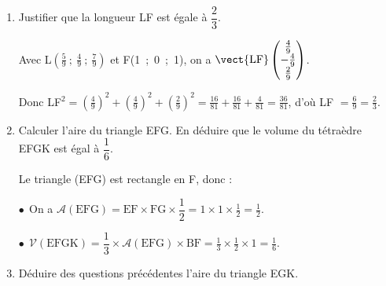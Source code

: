 \begin{enumerate}
L étant le projeté orthogonal de F sur le plan (EGK), L est un point de la droite $(d)$ et du plan (EGK) : ses coordonnées vérifient donc les équations de $(d)$ et du plan (EGK), donc le système :

$\left\{\begin{array}{l c l}
x &=& 1 + 2t\\
y &=&\phantom{1}- 2t\\
z &=&1 + t\\
2x - 2y + z&=&1
\end{array}\right., t \in \R$

En remplaçant $x$, \: $y$,\: et $z$ par leurs expressions en fonction de $t$ dans la dernière équation on obtient :

$2(1 + 2t) - 2\times (- 2t) + 1 + t = 1\iff 2 + 4t + 4t +t + 1 = 1\iff 9t = - 2\iff t = - \dfrac29$.
On a donc : $x = 1 + 2\times \left(- \dfrac29\right) = 1 - \dfrac{4}{9} = \dfrac{5}{9}$ ;

$y = - 2 \times \left(- \dfrac29\right)  = \dfrac49$ ;

$z = 1 - \dfrac29 = \dfrac79$.

Conclusion : L$\left(\dfrac59~;~\dfrac49~;~\dfrac79\right)$.
\item Justifier que la longueur LF est égale à $\dfrac23$.

Avec L$\left(\frac59~;~\frac49~;~\frac79\right)$ et F(1~;~0~;~1), on a $\vect{\text{LF}}\begin{pmatrix}\frac49\\-  \frac49\\\frac29 \end{pmatrix}$.

Donc LF$^2 = \left(\frac49\right)^2 + \left(\frac49\right)^2 + \left(\frac29\right)^2  = \frac{16}{81} + \frac{16}{81} + \frac{4}{81} = \frac{36}{81}$, d'où LF $= \frac69 = \frac23$.
\item Calculer l'aire du triangle EFG. En déduire que le volume du tétraèdre EFGK est égal à $\dfrac16$.

Le triangle (EFG) est rectangle en F, donc :

$\bullet~~$On a $\mathcal{A}(\text{EFG}) = \text{EF} \times \text{FG} \times \dfrac12 = 1 \times 1 \times \frac12 = \frac12$.

$\bullet~~$$\mathcal{V}(\text{EFGK}) = \dfrac13 \times \mathcal{A}(\text{EFG}) \times \text{BF} = \frac13 \times \frac12 \times 1 = \frac16$.
\item Déduire des questions précédentes l'aire du triangle EGK.


\end{enumerate}
